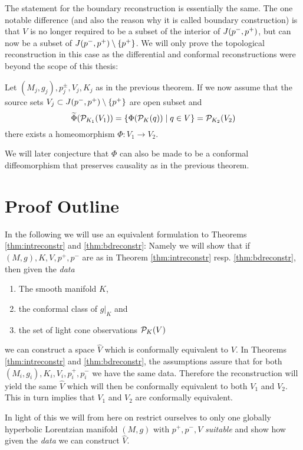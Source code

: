 The statement for the boundary reconstruction is essentially the same. The one notable difference (and also the reason why it is called boundary construction) is that $V$ is no longer required to be a subset of the interior of $J(p^-,p^+)$, but can now be a subset of $J(p^-,p^+) \setminus \{p^+\}$. We will only prove the topological reconstruction in this case as the differential and conformal reconstructions were beyond the scope of this thesis:
\begin{theorem}\label{thm:bdreconstr}
    Let $(M_j,g_j), p^\pm_j, V_j, K_j$ as in the previous theorem.
    If we now assume that the source sets $V_j\subset J(p^-,p^+)\setminus\{p^+\}$ are open subset and
    \[
    \widetilde{\Phi}({\mathcal{P}}_{K_1}(V_1)) = \{\Phi({\mathcal{P}}_K(q))\mid q \in V\} = {\mathcal{P}}_{K_2}(V_2)
    \]
    there exists a homeomorphism $\Phi:V_1\to V_2$.
\end{theorem}
We will later conjecture that $\Phi$ can also be made to be a conformal diffeomorphism that preserves causality as in the previous theorem.

\section{Proof Outline}
\begin{remark}[Data]\label{rmk:data} 
    In the following we will use an equivalent formulation to Theorems \ref{thm:intreconstr} and \ref{thm:bdreconstr}: Namely we will show that if $(M,g), K, V, p^+,p^-$ are as in Theorem \ref{thm:intreconstr} resp. \ref{thm:bdreconstr}, then given the \emph{data}
    \begin{enumerate}[label={\textnormal{(\arabic*)}}]
        \item The smooth manifold $K$,
        \item the conformal class of $g\rvert_K$ and
        \item the set of light cone observations ${\mathcal{P}}_K(V)$
    \end{enumerate}
    we can construct a space $\widehat{V}$ which is conformally equivalent to $V$.
    In Theorems \ref{thm:intreconstr} and \ref{thm:bdreconstr}, the assumptions assure that for both $(M_i,g_i), K_i, V_i, p^+_i,p^-_i$ we have the same data. Therefore the reconstruction will yield the same $\widehat{V}$ which will then be conformally equivalent to both $V_1$ and $V_2$. This in turn implies that $V_1$ and $V_2$ are conformally equivalent.

    In light of this we will from here on restrict ourselves to only one globally hyperbolic Lorentzian manifold $(M,g)$ with $p^+,p^-, V$ \emph{suitable} and show how given the \emph{data} we can construct $\widehat{V}$.
\end{remark}
